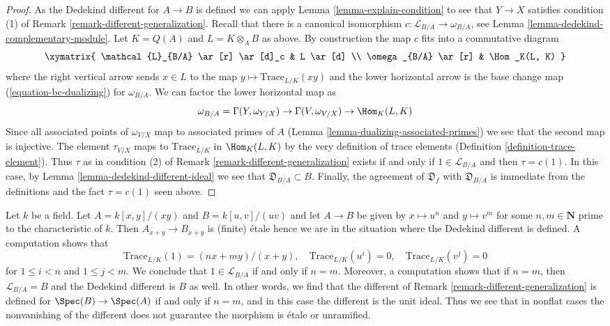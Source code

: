 \begin{proof}
As the Dedekind different for $A \to B$ is defined we can apply
Lemma \ref{lemma-explain-condition} to see that
$Y \to X$ satisfies condition (1) of
Remark \ref{remark-different-generalization}.
Recall that there is a canonical isomorphism
$c : \mathcal{L}_{B/A} \to \omega_{B/A}$, see
Lemma \ref{lemma-dedekind-complementary-module}.
Let $K = Q(A)$ and $L = K \otimes_A B$ as above.
By construction the map $c$ fits into a commutative diagram
$$
\xymatrix{
\mathcal{L}_{B/A} \ar[r] \ar[d]_c & L \ar[d] \\
\omega_{B/A} \ar[r] & \Hom_K(L, K)
}
$$
where the right vertical arrow sends $x \in L$ to the map
$y \mapsto \text{Trace}_{L/K}(xy)$ and the lower horizontal
arrow is the base change map (\ref{equation-bc-dualizing}) for $\omega_{B/A}$.
We can factor the lower horizontal map as
$$
\omega_{B/A} = \Gamma(Y, \omega_{Y/X})
\to \Gamma(V, \omega_{V/X}) \to \Hom_K(L, K)
$$
Since all associated points of $\omega_{V/X}$
map to associated primes of $A$
(Lemma \ref{lemma-dualizing-associated-primes})
we see that the second map is injective.
The element $\tau_{V/X}$ maps to $\text{Trace}_{L/K}$ in
$\Hom_K(L, K)$ by the very definition of trace elements
(Definition \ref{definition-trace-element}).
Thus $\tau$ as in condition (2) of
Remark \ref{remark-different-generalization}
exists if and only if $1 \in \mathcal{L}_{B/A}$ and then
$\tau = c(1)$. In this case, by Lemma \ref{lemma-dedekind-different-ideal}
we see that $\mathfrak{D}_{B/A} \subset B$.
Finally, the agreement of $\mathfrak{D}_f$ with $\mathfrak{D}_{B/A}$
is immediate from the definitions and the fact $\tau = c(1)$ seen above.
\end{proof}

\begin{example}
\label{example-no-different}
Let $k$ be a field. Let $A = k[x, y]/(xy)$ and $B = k[u, v]/(uv)$ and let
$A \to B$ be given by $x \mapsto u^n$ and $y \mapsto v^m$ for some
$n, m \in \mathbf{N}$ prime to the characteristic of $k$. Then
$A_{x + y} \to B_{x + y}$ is (finite) \'etale hence we are in the situation
where the Dedekind different is defined. A computation shows that
$$
\text{Trace}_{L/K}(1) = (nx + my)/(x + y),\quad
\text{Trace}_{L/K}(u^i) = 0,\quad \text{Trace}_{L/K}(v^j) = 0
$$
for $1 \leq i < n$ and $1 \leq j < m$. We conclude that
$1 \in \mathcal{L}_{B/A}$ if and only if $n = m$. Moreover, a
computation shows that if $n = m$, then $\mathcal{L}_{B/A} = B$
and the Dedekind different is $B$ as well. In other words, we find that
the different of Remark \ref{remark-different-generalization}
is defined for $\Spec(B) \to \Spec(A)$
if and only if $n = m$, and in this case the different is the
unit ideal. Thus we see that in nonflat cases the nonvanishing
of the different does not guarantee the morphism is \'etale or unramified.
\end{example}















